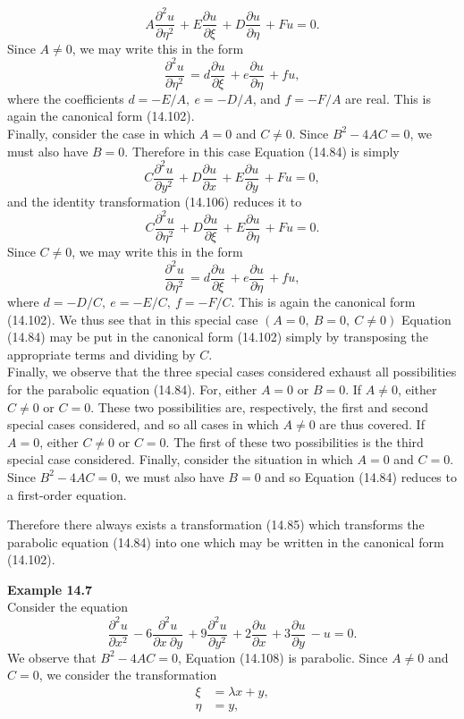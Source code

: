 \documentclass[11pt,a4paper, twoside]{report}
\newcommand{\pf}[2]{\dfrac{\partial #1}{\partial #2}\,}
\newcommand{\pfn}[3]{\dfrac{\partial^#3 #1}{\partial #2^#3}\,}
\newcommand{\pfp}[4]{\dfrac{\partial^#4 #1}{\partial #2\ \partial #3}\,}
\begin{document}
	$$
	A\pfn{u}{\eta}{2} + E\pf{u}{\xi} + D\pf{u}{\eta} + Fu = 0.
	$$
	Since $A \neq 0$, we may write this in the form
	$$
	\pfn{u}{\eta}{2} = d\pf{u}{\xi} + e\pf{u}{\eta} + fu,
	$$
	where the coefficients $d = -E/A,\ e = -D/A$, and $f = -F/A$ are real. This is again the canonical form (14.102).\\
	Finally, consider the case in which $A = 0$ and $C \neq 0$. Since $B^2 - 4AC = 0$, we must also have $B = 0$. Therefore in this case Equation (14.84) is simply
	$$
	C\pfn{u}{y}{2} + D\pf{u}{x} + E\pf{u}{y} + Fu = 0,
	$$
	and the identity transformation (14.106) reduces it to
	$$
	C\pfn{u}{\eta}{2} + D\pf{u}{\xi} + E\pf{u}{\eta} + Fu = 0.
	$$
	Since $C \neq 0$, we may write this in the form
	$$
	\pfn{u}{\eta}{2} = d\pf{u}{\xi} + e\pf{u}{\eta} + fu,
	$$
	where $d = -D/C,\ e = -E/C,\ f = -F/C$. This is again the canonical form (14.102). We thus see that in this special case $(A = 0,\ B = 0,\ C \neq 0)$ Equation (14.84) may be put in the canonical form (14.102) simply by transposing the appropriate terms and dividing by $C$.\\
	Finally, we observe that the three special cases considered exhaust all possibilities for the parabolic equation (14.84). For, either $A = 0$ or $B = 0$. If $A \neq 0$, either $C \neq 0$ or $C = 0$. These two possibilities are, respectively, the first and second special cases considered, and so all cases in which $A \neq 0$ are thus covered. If $A = 0$, either $C \neq 0$ or $C = 0$. The first of these two possibilities is the third special case considered. Finally, consider the situation in which $A = 0$ and $C = 0$. Since $B^2 - 4AC = 0$, we must also have $B = 0$ and so Equation (14.84) reduces to a first-order equation.\par
	Therefore  there always exists a  transformation  (14.85)  which  transforms  the parabolic equation (14.84) into one which may be written in the canonical form (14.102).\par
	\textbf{Example 14.7}\\
	Consider the equation
	\begin{equation}\tag{14.108}
		\pfn{u}{x}{2} - 6\pfp{u}{x}{y}{2} + 9\pfn{u}{y}{2} + 2\pf{u}{x} + 3\pf{u}{y} - u =0.
	\end{equation}
	We observe that $B^2 - 4AC = 0$, Equation (14.108) is parabolic. Since $A \neq 0$ and $C = 0$, we consider the transformation
	\begin{equation}\tag{14.103}
		\begin{aligned}
			\xi &= \lambda x + y,\\
			\eta &= y,
		\end{aligned}
	\end{equation}
\end{document}
